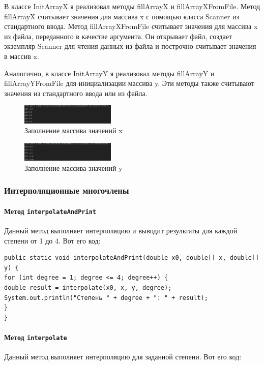 \documentclass[12pt]{article}
\begin{document}
    В классе InitArrayX я реализовал методы fillArrayX и fillArrayXFromFile. Метод fillArrayX считывает значения для массива x с помощью класса Scanner из стандартного ввода. Метод fillArrayXFromFile считывает значения для массива x из файла, переданного в качестве аргумента. Он открывает файл, создает экземпляр Scanner для чтения данных из файла и построчно считывает значения в массив x.

    Аналогично, в классе InitArrayY я реализовал методы fillArrayY и fillArrayYFromFile для инициализации массива y. Эти методы также считывают значения из стандартного ввода или из файла.

    \begin{figure}[htbp]
        \centering
        \includegraphics[width=0.4\textwidth]{image/initX}
        \caption{Заполнение массива значений x}
    \end{figure}

    \begin{figure}[htbp]
        \centering
        \includegraphics[width=0.4\textwidth]{image/initY}
        \caption{Заполнение массива значений y}
    \end{figure}

    \subsubsection{Интерполяционные многочлены}

    \paragraph{Метод \texttt{interpolateAndPrint}}
    Данный метод выполняет интерполяцию и выводит результаты для каждой степени от 1 до 4. Вот его код:

    \begin{verbatim}
public static void interpolateAndPrint(double x0, double[] x, double[] y) {
for (int degree = 1; degree <= 4; degree++) {
double result = interpolate(x0, x, y, degree);
System.out.println("Степень " + degree + ": " + result);
}
}
    \end{verbatim}

    \paragraph{Метод \texttt{interpolate}}
    Данный метод выполняет интерполяцию для заданной степени. Вот его код:
\end{document}

